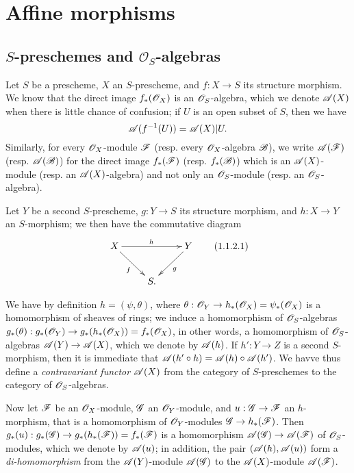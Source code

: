 \section{Affine morphisms}
\label{section:II.1}

\subsection{$S$-preschemes and $\mathcal{O}_S$-algebras}
\label{subsection:II.1.1}

\begin{env}[1.1.1]
\label{II.1.1.1}
Let $S$ be a prescheme, $X$ an $S$-prescheme, and $f:X\to S$ its structure morphism.
We know  that the direct image $f_*(\mathscr{O}_X)$ is an $\mathscr{O}_S$-algebra, which we
denote $\mathscr{A}(X)$ when there is little chance of confusion; if $U$ is an open subset of $S$, then we have
\[
  \mathscr{A}(f^{-1}(U))=\mathscr{A}(X)|U.
\]
Similarly, for every $\mathscr{O}_X$-module $\mathscr{F}$ (resp. every $\mathscr{O}_X$-algebra $\mathscr{B}$), we write $\mathscr{A}(\mathscr{F})$ (resp. $\mathscr{A}(\mathscr{B})$) for the direct image $f_*(\mathscr{F})$ (resp. $f_*(\mathscr{B})$) which is an $\mathscr{A}(X)$-module (resp. an $\mathscr{A}(X)$-algebra) and not only an $\mathscr{O}_S$-module (resp. an $\mathscr{O}_S$-algebra).
\end{env}

\begin{env}[1.1.2]
\label{II.1.1.2}
Let $Y$ be a second $S$-prescheme, $g:Y\to S$ its structure morphism, and $h:X\to Y$ an $S$-morphism; we then have the commutative diagram
\[
\label{II.1.1.2.1}
  \xymatrix{
    X\ar[rr]^h\ar[rd]_f & &
    Y\ar[ld]^g\\
    & S.
  }
  \tag{1.1.2.1}
\]

We have by definition $h=(\psi,\theta)$, where $\theta:\sh{O}_Y\to h_*(\sh{O}_X)=\psi_*(\sh{O}_X)$ is a homomorphism of sheaves of rings; we induce  a homomorphism of $\mathscr{O}_S$-algebras $g_*(\theta):g_*(\sh{O}_Y)\to g_*(h_*(\sh{O}_X))=f_*(\sh{O}_X)$, in other words, a homomorphism of $\mathscr{O}_S$-algebras $\sh{A}(Y)\to\sh{A}(X)$, which we denote by $\mathscr{A}(h)$.
If $h':Y\to Z$ is a second $S$-morphism, then it is immediate that $\mathscr{A}(h'\circ h)=\mathscr{A}(h)\circ\mathscr{A}(h')$.
We havve thus define a \emph{contravariant functor $\mathscr{A}(X)$} from the category of $S$-preschemes to the category of $\mathscr{O}_S$-algebras.

Now let $\mathscr{F}$ be an $\mathscr{O}_X$-module, $\mathscr{G}$ an $\mathscr{O}_Y$-module, and $u:\sh{G}\to\sh{F}$ an $h$-morphism, that is  a homomorphism of $\mathscr{O}_Y$-modules $\sh{G}\to h_*(\sh{F})$.
Then $g_*(u):g_*(\sh{G})\to g_*(h_*(\sh{F}))=f_*(\sh{F})$ is a homomorphism $\sh{A}(\sh{G})\to\sh{A}(\sh{F})$ of $\mathscr{O}_S$-modules, which we denote by $\mathscr{A}(u)$; in addition, the pair $(\mathscr{A}(h),\mathscr{A}(u))$ form a \emph{di-homomorphism} from the $\mathscr{A}(Y)$-module $\mathscr{A}(\mathscr{G})$ to the $\mathscr{A}(X)$-module $\mathscr{A}(\mathscr{F})$.
\end{env}

